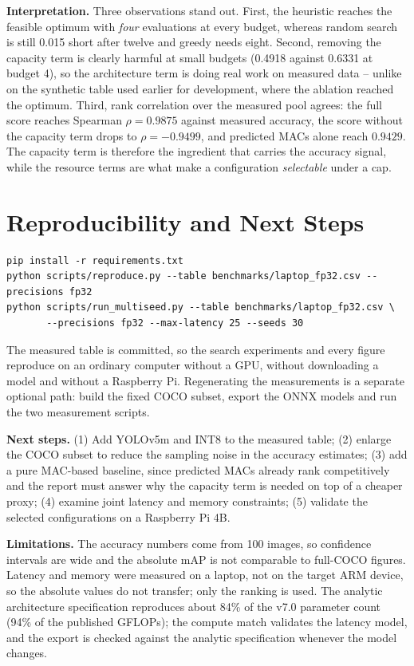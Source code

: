 \documentclass[12pt,a4paper]{article}
\begin{document}
\textbf{Interpretation.} Three observations stand out. First, the heuristic reaches the
feasible optimum with \emph{four} evaluations at every budget, whereas random search is
still 0.015 short after twelve and greedy needs eight. Second, removing the capacity term
is clearly harmful at small budgets (0.4918 against 0.6331 at budget 4), so the
architecture term is doing real work on measured data -- unlike on the synthetic table
used earlier for development, where the ablation reached the optimum. Third, rank
correlation over the measured pool agrees: the full score reaches Spearman \(\rho=0.9875\)
against measured accuracy, the score without the capacity term drops to \(\rho=-0.9499\),
and predicted MACs alone reach \(0.9429\). The capacity term is therefore the ingredient
that carries the accuracy signal, while the resource terms are what make a configuration
\emph{selectable} under a cap.

\section{Reproducibility and Next Steps}

\begin{verbatim}
pip install -r requirements.txt
python scripts/reproduce.py --table benchmarks/laptop_fp32.csv --precisions fp32
python scripts/run_multiseed.py --table benchmarks/laptop_fp32.csv \
       --precisions fp32 --max-latency 25 --seeds 30
\end{verbatim}

The measured table is committed, so the search experiments and every figure reproduce on
an ordinary computer without a GPU, without downloading a model and without a Raspberry
Pi. Regenerating the measurements is a separate optional path: build the fixed COCO
subset, export the ONNX models and run the two measurement scripts.

\textbf{Next steps.} (1) Add YOLOv5m and INT8 to the measured table; (2) enlarge the COCO
subset to reduce the sampling noise in the accuracy estimates; (3) add a pure MAC-based
baseline, since predicted MACs already rank competitively and the report must answer why
the capacity term is needed on top of a cheaper proxy; (4) examine joint latency and
memory constraints; (5) validate the selected configurations on a Raspberry Pi 4B.

\textbf{Limitations.} The accuracy numbers come from 100 images, so confidence intervals
are wide and the absolute mAP is not comparable to full-COCO figures. Latency and memory
were measured on a laptop, not on the target ARM device, so the absolute values do not
transfer; only the ranking is used. The analytic architecture specification reproduces
about 84\% of the v7.0 parameter count (94\% of the published GFLOPs); the compute match validates
the latency model, and the export is checked against the analytic specification whenever
the model changes.
\end{document}
